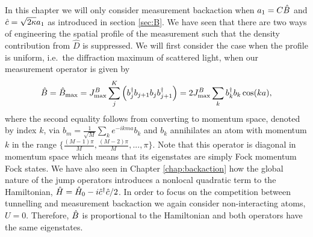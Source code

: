 In this chapter we will only consider measurement backaction when
$a_1 = C \hat{B}$ and $\hat{c} = \sqrt{2 \kappa} a_1$ as introduced in
section \ref{sec:B}. We have seen that there are two ways of
engineering the spatial profile of the measurement such that the
density contribution from $\hat{D}$ is suppressed. We will first
consider the case when the profile is uniform, i.e.~the diffraction
maximum of scattered light, when our measurement operator is given by
\begin{equation}
  \hat{B} = \hat{B}_\mathrm{max} = J^B_\mathrm{max} \sum_j^K \left( b^\dagger_j b_{j+1} b_j
    b^\dagger_{j+1} \right)
  = 2 J^B_\mathrm{max} \sum_k b^\dagger_k b_k \cos(ka),
\end{equation}
where the second equality follows from converting to momentum space,
denoted by index $k$, via
$b_m = \frac{1}{\sqrt{M}} \sum_k e^{-ikma} b_k$ and $b_k$ annihilates
an atom with momentum $k$ in the range
$\{ \frac{(M-1) \pi} {M}, \frac{(M-2) \pi} {M}, ..., \pi \}$. Note
that this operator is diagonal in momentum space which means that its
eigenstates are simply Fock momentum Fock states. We have also seen in
Chapter \ref{chap:backaction} how the global nature of the jump
operators introduces a nonlocal quadratic term to the Hamiltonian,
$\hat{H} = \hat{H}_0 - i \hat{c}^\dagger \hat{c} / 2$. In order to focus on the
competition between tunnelling and measurement backaction we again
consider non-interacting atoms, $U = 0$. Therefore, $\hat{B}$ is
proportional to the Hamiltonian and both operators have the same
eigenstates.

